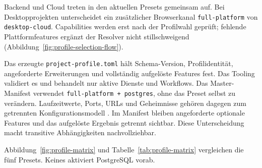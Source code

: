 Backend und Cloud treten in den aktuellen Presets gemeinsam auf. Bei
Desktopprojekten unterscheidet ein zusätzlicher Browserkanal
\texttt{full-platform} von \texttt{desktop-cloud}. Capabilities werden erst
nach der Profilwahl geprüft; fehlende Plattformfeatures ergänzt der Resolver
nicht stillschweigend (Abbildung~\ref{fig:profile-selection-flow}).



Das erzeugte \texttt{project-profile.toml} hält Schema-Version,
Profilidentität, angeforderte Erweiterungen und vollständig aufgelöste Features
fest. Das Tooling validiert es und behandelt nur aktive Dienste und Workflows.
Das Master-Manifest verwendet \texttt{full-platform + postgres}, ohne das
Preset selbst zu verändern. Laufzeitwerte, Ports, URLs und Geheimnisse gehören
dagegen zum getrennten Konfigurationsmodell
\parencite{kleiveist2026configuration,kleiveist2026governance-snapshot}.
Im Manifest bleiben angeforderte optionale Features und das aufgelöste Ergebnis
getrennt sichtbar. Diese Unterscheidung macht transitive Abhängigkeiten
nachvollziehbar.

Abbildung~\ref{fig:profile-matrix} und Tabelle~\ref{tab:profile-matrix}
vergleichen die fünf Presets. Keines aktiviert PostgreSQL vorab.



